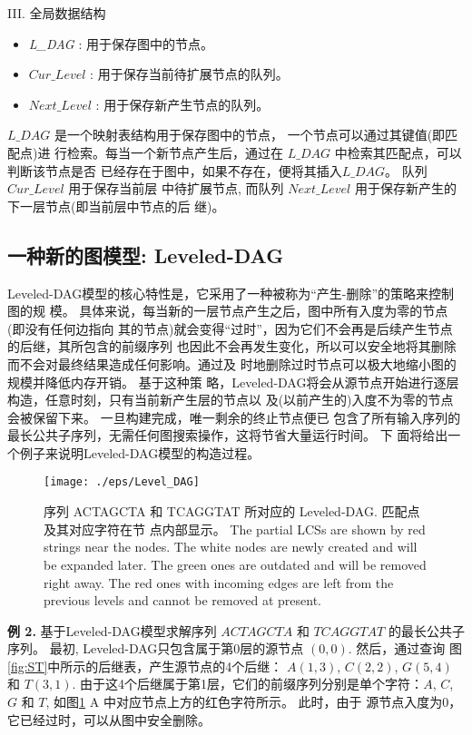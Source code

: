 \documentclass[utf8]{frontiersSCNS} %
\begin{document}
III. 全局数据结构
\label{sec:auxiliary}

\begin{itemize}
\item \emph{L\_DAG} : 用于保存图中的节点。
\item $Cur\_Level$ : 用于保存当前待扩展节点的队列。
\item $Next\_Level$ : 用于保存新产生节点的队列。
\end{itemize}



$L\_DAG$ 是一个映射表结构用于保存图中的节点， 一个节点可以通过其键值(即匹配点)进
行检索。每当一个新节点产生后，通过在 $L\_DAG$ 中检索其匹配点，可以判断该节点是否
已经存在于图中，如果不存在，便将其插入$L\_DAG$。 队列 $Cur\_Level$ 用于保存当前层
中待扩展节点, 而队列 $Next\_Level$ 用于保存新产生的下一层节点(即当前层中节点的后
继)。


\subsection{一种新的图模型: Leveled-DAG}
\label{sec:leveled DAG}

Leveled-DAG模型的核心特性是，它采用了一种被称为“产生-删除”的策略来控制图的规
模。 具体来说，每当新的一层节点产生之后，图中所有入度为零的节点(即没有任何边指向
其的节点)就会变得“过时”，因为它们不会再是后续产生节点的后继，其所包含的前缀序列
也因此不会再发生变化，所以可以安全地将其删除而不会对最终结果造成任何影响。通过及
时地删除过时节点可以极大地缩小图的规模并降低内存开销。 基于这种策
略，Leveled-DAG将会从源节点开始进行逐层构造，任意时刻，只有当前新产生层的节点以
及(以前产生的)入度不为零的节点会被保留下来。 一旦构建完成，唯一剩余的终止节点便已
包含了所有输入序列的最长公共子序列，无需任何图搜索操作，这将节省大量运行时间。 下
面将给出一个例子来说明Leveled-DAG模型的构造过程。

\begin{figure}
  \centering
  \texttt{[image: ./eps/Level\_DAG]}
  \caption{序列 ACTAGCTA 和 TCAGGTAT 所对应的 Leveled-DAG. 匹配点及其对应字符在节
    点内部显示。 The partial LCSs are shown by red strings near the nodes. The
    white nodes are newly created and will be expanded later. The green ones are
    outdated and will be removed right away. The red ones with incoming edges
    are left from the previous levels and cannot be removed at present.}
  \label{fig:Leveled-DAG}
\end{figure}

\textbf{例 2.} 基于Leveled-DAG模型求解序列 $ACTAGCTA$ 和 $TCAGGTAT$ 的最长公共子
序列。 最初, Leveled-DAG只包含属于第0层的源节点 $(0, 0)$. 然后，通过查询
图\ref{fig:ST}中所示的后继表，产生源节点的4个后继： $A(1, 3)$, $C(2, 2)$, $G(5,
4)$和 $T(3, 1)$. 由于这4个后继属于第1层，它们的前缀序列分别是单个字符：$A$, $C$,
$G$ 和 $T$, 如图\ref{fig:Leveled-DAG} A 中对应节点上方的红色字符所示。 此时，由于
源节点入度为0，它已经过时，可以从图中安全删除。
\end{document}
